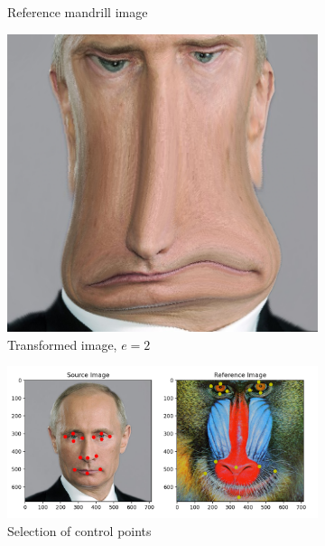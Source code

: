 \documentclass[UTF8]{ctexart}
\begin{document}
\begin{figure}[htbp]
\begin{subfigure}{0.3\textwidth}
        \caption{Reference mandrill image}
    \end{subfigure}%
    \hfill
    \begin{subfigure}{0.3\textwidth}
        \centering
        \includegraphics[width=\linewidth]{putinreg2.png}
        \caption{Transformed image, $e=2$}
    \end{subfigure}%
    \vspace{0.5cm}
    \begin{subfigure}{0.65\textwidth}
        \centering
        \includegraphics[width=\linewidth]{selection.png}
        \caption{Selection of control points}
    \end{subfigure}
    \hfill
    \begin{subfigure}{0.3\textwidth}
        \centering

\end{subfigure}
\end{figure}
\end{document}
